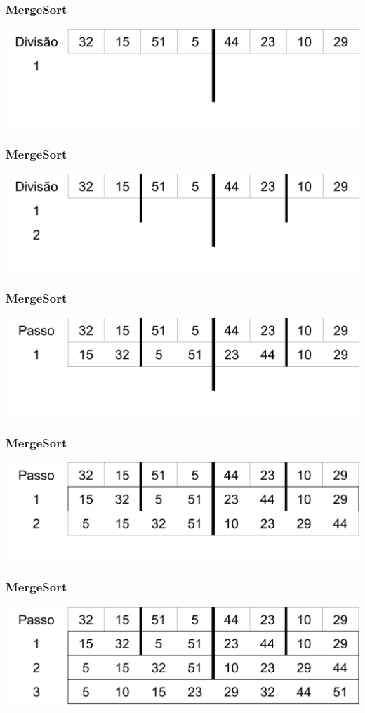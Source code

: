 \documentclass{beamer}
\begin{document}
\begin{frame}
    \frametitle{MergeSort}
    \centering
    \includegraphics[scale=0.5]{images/1.png}
\end{frame}

\begin{frame}
    \frametitle{MergeSort}
    \centering
    \includegraphics[scale=0.5]{images/2.png}
\end{frame}

\begin{frame}
    \frametitle{MergeSort}
    \centering
    \includegraphics[scale=0.5]{images/3.png}
\end{frame}

\begin{frame}
    \frametitle{MergeSort}
    \centering
    \includegraphics[scale=0.5]{images/4.png}
\end{frame}

\begin{frame}
    \frametitle{MergeSort}
    \centering
    \includegraphics[scale=0.5]{images/5.png}
\end{frame}
\end{document}

